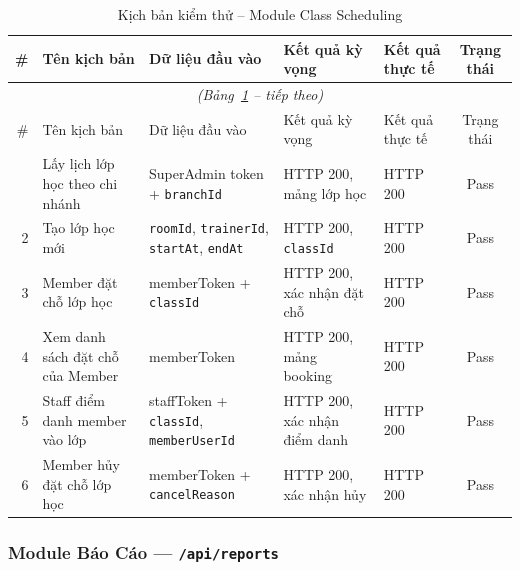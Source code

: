 \begin{longtable}{r p{3.2cm} p{2.8cm} p{2.8cm} p{2cm} c}
\caption{Kịch bản kiểm thử – Module Class Scheduling}
\label{tab:tc-class} \\
\toprule
\# & Tên kịch bản & Dữ liệu đầu vào & Kết quả kỳ vọng & Kết quả thực tế & Trạng thái \\
\midrule
\endfirsthead
\multicolumn{6}{c}{\textit{(Bảng~\ref{tab:tc-class} – tiếp theo)}} \\ \toprule
\# & Tên kịch bản & Dữ liệu đầu vào & Kết quả kỳ vọng & Kết quả thực tế & Trạng thái \\ \midrule
\endhead \midrule \endfoot \bottomrule \endlastfoot
1 & Lấy lịch lớp học theo chi nhánh      & SuperAdmin token + \texttt{branchId} & HTTP 200, mảng lớp học              & HTTP 200 & Pass \\
2 & Tạo lớp học mới                       & \texttt{roomId}, \texttt{trainerId}, \texttt{startAt}, \texttt{endAt} & HTTP 200, \texttt{classId} & HTTP 200 & Pass \\
3 & Member đặt chỗ lớp học                & memberToken + \texttt{classId}       & HTTP 200, xác nhận đặt chỗ         & HTTP 200 & Pass \\
4 & Xem danh sách đặt chỗ của Member      & memberToken                          & HTTP 200, mảng booking              & HTTP 200 & Pass \\
5 & Staff điểm danh member vào lớp        & staffToken + \texttt{classId}, \texttt{memberUserId} & HTTP 200, xác nhận điểm danh & HTTP 200 & Pass \\
6 & Member hủy đặt chỗ lớp học            & memberToken + \texttt{cancelReason}  & HTTP 200, xác nhận hủy             & HTTP 200 & Pass \\
\end{longtable}

\subsubsection{Module Báo Cáo — \texttt{/api/reports}}

